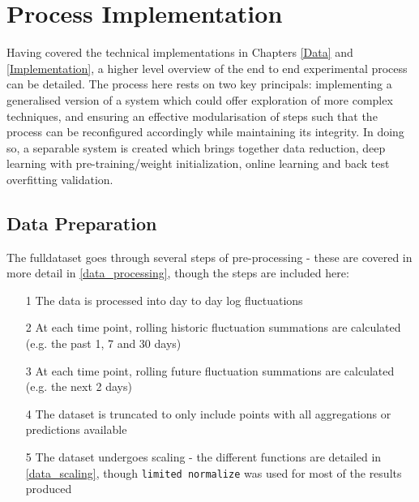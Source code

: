 \documentclass[a4paper,11pt,oneside]{article}
\theoremstyle{plain}
\theoremstyle{definition}
\begin{document}
\newpage
\section{Process Implementation}\label{imp_proc}

Having covered the technical implementations in Chapters \ref{Data} and \ref{Implementation}, a higher level overview of the end to end experimental process can be detailed. The process here rests on two key principals: implementing a generalised version of a system which could offer exploration of more complex techniques, and ensuring an effective modularisation of steps such that the process can be reconfigured accordingly while maintaining its integrity. In doing so, a separable system is created which brings together data reduction, deep learning with pre-training/weight initialization, online learning and back test overfitting validation.

\subsection{Data Preparation}\label{proc_dataprep}

The fulldataset goes through several steps of pre-processing - these are covered in more detail in \ref{data_processing}, though the steps are included here:

	\begin{itemize}
	\item[1] The data is processed into day to day log fluctuations
	\item[2] At each time point, rolling historic fluctuation summations are calculated (e.g. the past 1, 7 and 30 days)
	\item[3] At each time point, rolling future fluctuation summations are calculated (e.g. the next 2 days)
	\item[4] The dataset is truncated to only include points with all aggregations or predictions available
	\item[5] The dataset undergoes scaling - the different functions are detailed in \ref{data_scaling}, though \texttt{limited normalize} was used for most of the results produced
\end{itemize}
\end{document}
